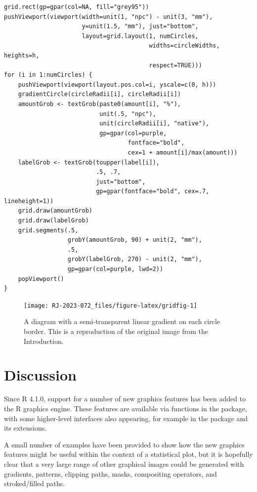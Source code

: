 \begin{verbatim}
grid.rect(gp=gpar(col=NA, fill="grey95"))
pushViewport(viewport(width=unit(1, "npc") - unit(3, "mm"),
                      y=unit(1.5, "mm"), just="bottom",
                      layout=grid.layout(1, numCircles,
                                         widths=circleWidths, heights=h, 
                                         respect=TRUE)))
for (i in 1:numCircles) {
    pushViewport(viewport(layout.pos.col=i, yscale=c(0, h)))
    gradientCircle(circleRadii[i], circleRadii[i])
    amountGrob <- textGrob(paste0(amount[i], "%"),
                           unit(.5, "npc"), 
                           unit(circleRadii[i], "native"),
                           gp=gpar(col=purple,
                                   fontface="bold",
                                   cex=1 + amount[i]/max(amount)))
    labelGrob <- textGrob(toupper(label[i]),
                          .5, .7,
                          just="bottom",
                          gp=gpar(fontface="bold", cex=.7, lineheight=1))
    grid.draw(amountGrob)
    grid.draw(labelGrob)
    grid.segments(.5,
                  grobY(amountGrob, 90) + unit(2, "mm"),
                  .5,
                  grobY(labelGrob, 270) - unit(2, "mm"),
                  gp=gpar(col=purple, lwd=2))
    popViewport()
}
\end{verbatim}

\begin{figure}[h]
\texttt{[image: RJ-2023-072\_files/figure-latex/gridfig-1]} \caption{A diagram with a semi-transparent linear gradient on each circle border.  This is a reproduction of the original image from the Introduction.}\label{fig:gridfig}
\end{figure}

\hypertarget{discussion}{%
\section{Discussion}\label{discussion}}

Since R 4.1.0, support for a number of new graphics features has been
added to the R graphics engine. These features are available via
functions in the  package, with some higher-level interfaces
also appearing, for example in the  package and its
extensions.

A small number of
examples have been provided to show how the new graphics features
might be useful within the context of a statistical plot, but
it is hopefully clear that a very large
range of other graphical images could be generated with gradients,
patterns, clipping paths, masks, compositing operators,
and stroked/filled paths.

